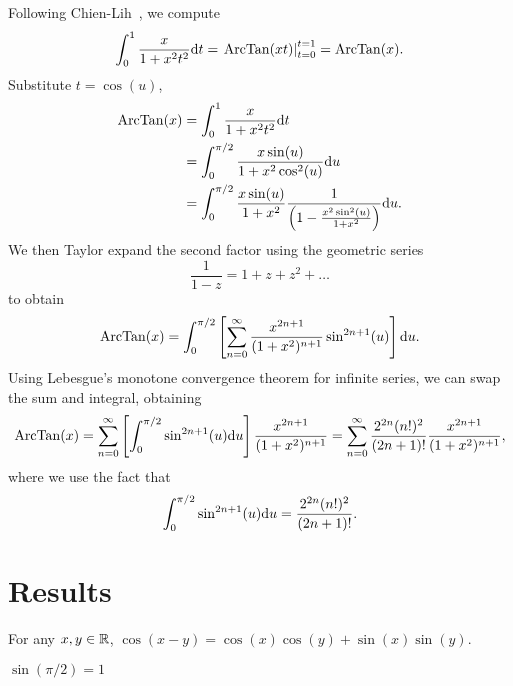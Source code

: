 Following Chien-Lih~\cite{chien-lih2005:elementary}, we compute
\begin{equation}
\int^{1}_{0}\frac{x}{1 + x^{2}t^{2}}\mathrm{d} t = \left.\operatorname{ArcTan}(xt)\right|^{t=1}_{t=0}
=\operatorname{ArcTan}(x).
\end{equation}
Substitute $t=\cos(u)$,
\begin{subequations}
\begin{align}
\operatorname{ArcTan}(x) &= \int^{1}_{0}\frac{x}{1 + x^{2}t^{2}}\mathrm{d} t\\
&= \int^{\pi/2}_{0}\frac{x\sin(u)}{1 + x^{2}\cos^{2}(u)}\mathrm{d} u\\
&=\int^{\pi/2}_{0}\frac{x\sin(u)}{1 + x^{2}}\frac{1}{\left(1 - \frac{x^{2}\sin^{2}(u)}{1 + x^{2}}\right)}\mathrm{d} u.
\end{align}
\end{subequations}
We then Taylor expand the second factor using the geometric series
\begin{equation}
\frac{1}{1 - z} = 1 + z + z^{2} + \dots
\end{equation}
to obtain
\begin{equation}
\operatorname{ArcTan}(x) = \int^{\pi/2}_{0}\left[\sum^{\infty}_{n=0}\frac{x^{2n+1}}{(1 + x^{2})^{n + 1}}
\sin^{2n+1}(u)\right]\mathrm{d} u.
\end{equation}
Using Lebesgue's monotone convergence theorem for infinite series, we
can swap the sum and integral, obtaining
\begin{equation}
\operatorname{ArcTan}(x) =\sum^{\infty}_{n=0}
 \left[\int^{\pi/2}_{0}\sin^{2n+1}(u)\mathrm{d} u\right]\frac{x^{2n+1}}{(1 + x^{2})^{n + 1}}
= \sum^{\infty}_{n = 0}\frac{2^{2n}(n!)^{2}}{(2n + 1)!}\frac{x^{2n+1}}{(1 + x^{2})^{n + 1}},
\end{equation}
where we use the fact that
\begin{equation}
\int^{\pi/2}_{0}\sin^{2n+1}(u)\mathrm{d} u = \frac{2^{2n}(n!)^{2}}{(2n + 1)!}.
\end{equation}

\section{Results}

\begin{axiom}\label{axiom:trigonometry:cos-subtraction-law}
For any $x,y\in\mathbb{R}$,  $\cos(x-y) = \cos(x)\cos(y) + \sin(x)\sin(y)$.
\end{axiom}

\begin{axiom}\label{axiom:trigonometry:sine-pi-over-2-equals-1}
  $\sin(\pi/2)=1$
\end{axiom}

